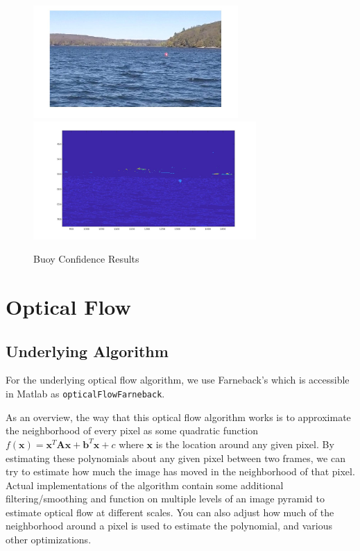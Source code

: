 \documentclass{article}
\begin{document}
\begin{figure}[H]
\includegraphics[width=7.8cm]{hsv_kmeans2_buoy}
\includegraphics[width=8.5cm]{hsv_kmeans2_buoy_result}
\centering
\caption{Buoy Confidence Results}
\label{fig:buoyconf}
\end{figure}

\section{Optical Flow}

\subsection{Underlying Algorithm}

For the underlying optical flow algorithm, we use Farneback's
\cite{farneback2003} which is accessible in Matlab as
\texttt{opticalFlowFarneback}.

As an overview, the way that this optical flow algorithm works is to
approximate the neighborhood of every pixel as some quadratic function
$f(\mathbf{x}) = \mathbf{x}^T \mathbf{A} \mathbf{x} + \mathbf{b}^T \mathbf{x} + c$
where $\mathbf{x}$ is the location around any given pixel. By estimating these
polynomials about any given pixel between two frames, we can try to estimate how
much the image has moved in the neighborhood of that pixel. Actual
implementations of the algorithm contain some additional filtering/smoothing and
function on multiple levels of an image pyramid to estimate optical flow at
different scales. You can also adjust how much of the neighborhood around a
pixel is used to estimate the polynomial, and various other optimizations.
\end{document}
